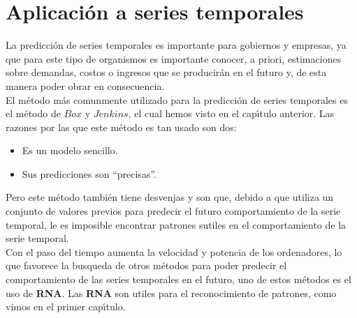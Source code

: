 %
%

\chapter{Aplicaci\'on a series temporales}

La predicci\'on de series temporales es importante para gobiernos y empresas, ya
que para este tipo de organismos es importante conocer, a priori, estimaciones
sobre demandas, costos o ingresos que se producir\'an en el futuro y, de esta
manera poder obrar en consecuencia.\\

El m\'etodo m\'as comunmente utilizado para la predicci\'on de series temporales
es el m\'etodo de $Box$ y $Jenkins$, el cual hemos visto en el cap\'{\i}tulo 
anterior. Las razones por las que este m\'etodo es tan usado son dos:
\begin{itemize}
\item Es un modelo sencillo.
\item Sus predicciones son ``precisas''.
\end{itemize}
Pero este m\'etodo tambi\'en tiene desvenjas y son que, debido a que utiliza
un conjunto de valores previos para predecir el futuro comportamiento de la
serie temporal, le es imposible encontrar patrones sutiles en el comportamiento
de la serie temporal.\\

Con el paso del tiempo aumenta la velocidad y potencia de los ordenadores, lo
que favorece la busqueda de otros m\'etodos para poder predecir el
comportamiento de las series temporales en el futuro, uno de estos m\'etodos es
el uso de \textbf{RNA}. Las \textbf{RNA} son utiles para el reconocimiento de
patrones, como vimos en el primer cap\'{\i}tulo.
%
\newpage
%

%
%



%
%



%
%



%
%




%
%



%
\newpage
%

%
%



%
%



%
%


